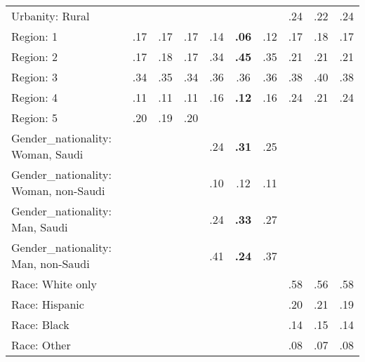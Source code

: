\begin{tabular}[t]{lccccccccc}
Urbanity: Rural &  &  &  &  &  &  & .24 & .22 & .24\\
\addlinespace
Region: 1 & .17 & .17 & .17 & .14 & \textbf{.06} & .12 & .17 & .18 & .17\\
Region: 2 & .17 & .18 & .17 & .34 & \textbf{.45} & .35 & .21 & .21 & .21\\
Region: 3 & .34 & .35 & .34 & .36 & .36 & .36 & .38 & .40 & .38\\
Region: 4 & .11 & .11 & .11 & .16 & \textbf{.12} & .16 & .24 & .21 & .24\\
Region: 5 & .20 & .19 & .20 &  &  &  &  &  & \\
\addlinespace
Gender\_nationality: Woman, Saudi &  &  &  & .24 & \textbf{.31} & .25 &  &  & \\
Gender\_nationality: Woman, non-Saudi &  &  &  & .10 & .12 & .11 &  &  & \\
Gender\_nationality: Man, Saudi &  &  &  & .24 & \textbf{.33} & .27 &  &  & \\
Gender\_nationality: Man, non-Saudi &  &  &  & .41 & \textbf{.24} & .37 &  &  & \\
\addlinespace
Race: White only &  &  &  &  &  &  & .58 & .56 & .58\\
Race: Hispanic &  &  &  &  &  &  & .20 & .21 & .19\\
Race: Black &  &  &  &  &  &  & .14 & .15 & .14\\
Race: Other &  &  &  &  &  &  & .08 & .07 & .08\\
\bottomrule
\end{tabular}